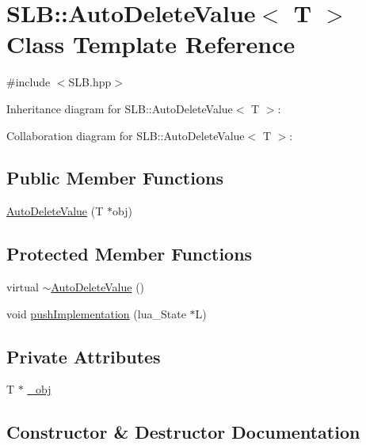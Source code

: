 \hypertarget{classSLB_1_1AutoDeleteValue}{}\section{S\+LB\+:\+:Auto\+Delete\+Value$<$ T $>$ Class Template Reference}
\label{classSLB_1_1AutoDeleteValue}


{\ttfamily \#include $<$S\+L\+B.\+hpp$>$}



Inheritance diagram for S\+LB\+:\+:Auto\+Delete\+Value$<$ T $>$\+:


Collaboration diagram for S\+LB\+:\+:Auto\+Delete\+Value$<$ T $>$\+:
\subsection*{Public Member Functions}
\begin{DoxyCompactItemize}
\item 
\hyperlink{classSLB_1_1AutoDeleteValue_adc50519a29a20ae5cdef1234493c7a05}{Auto\+Delete\+Value} (T $\ast$obj)
\end{DoxyCompactItemize}
\subsection*{Protected Member Functions}
\begin{DoxyCompactItemize}
\item 
virtual \hyperlink{classSLB_1_1AutoDeleteValue_a43ff019bc58f93f5f252a213c6079c77}{$\sim$\+Auto\+Delete\+Value} ()
\item 
void \hyperlink{classSLB_1_1AutoDeleteValue_a7b82d36e10f5d73a03c7b7a6d119fc27}{push\+Implementation} (lua\+\_\+\+State $\ast$L)
\end{DoxyCompactItemize}
\subsection*{Private Attributes}
\begin{DoxyCompactItemize}
\item 
T $\ast$ \hyperlink{classSLB_1_1AutoDeleteValue_a224f235ac74e3c3377a9b53066b3df17}{\+\_\+obj}
\end{DoxyCompactItemize}


\subsection{Constructor \& Destructor Documentation}
